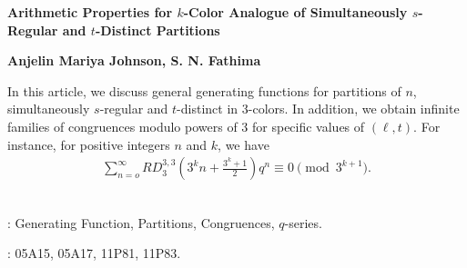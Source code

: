 \documentclass[11pt,a4paper]{article}
\numberwithin{equation}{section}
\theoremstyle{plain}
\renewenvironment{abstract}{
	\begin{adjustwidth}{1.3cm}{1.3cm}
		\noindent{\large\bfseries{A{\scriptsize BSTRACT.}}}
	}{
	\end{adjustwidth}
}
\begin{document}
	\begin{center}{\bf \large
			{Arithmetic Properties for $k$-Color Analogue of Simultaneously $s$-Regular and $t$-Distinct Partitions\\[0.15cm] }  }\vspace{0.2cm}
	\end{center}
	
	
	\begin{center}
		\footnotemark[1]
		\bf Anjelin Mariya Johnson, \footnotemark[2]
		\bf S. N. Fathima  %
		
		
	\end{center}

	\vspace{1 cm}
	\begin{center}
		\begin{minipage}{0.85\textwidth}  %
			
			 In this article, we discuss general generating functions for partitions of $n$, simultaneously $s$-regular and $t$-distinct in 3-colors. In addition, we obtain infinite families of congruences modulo powers of 3 for specific values of $(\ell,t)$. For instance, for positive integers $n$ and $k$, we have
				\begin{align*}
				\sum_{n=o}^{\infty}RD_3^{3,3}\left(3^kn+\frac{3^k+1}{2}\right)q^n\equiv0 \pmod{3^{k+1}}.
			\end{align*}
			\\
			\vspace{.125cm}
			
			 : Generating Function, Partitions, Congruences, $q$-series.\\
			\vspace{.05cm}
			
			 :  05A15, 05A17, 11P81, 11P83.
		\end{minipage}
	\end{center}
	
\end{document}
